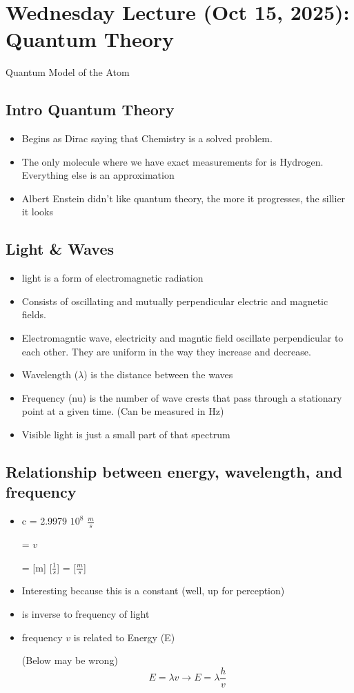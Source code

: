 \documentclass{article}
\begin{document}
\newpage

\section{Wednesday Lecture (Oct 15, 2025):\\ Quantum Theory}
Quantum Model of the Atom
\subsection{Intro Quantum Theory}
\begin{itemize}
  \item Begins as Dirac saying that Chemistry is a solved problem.
  \item The only molecule where we have exact measurements for is Hydrogen. Everything else is an approximation
  \item Albert Enstein didn't like quantum theory, the more it progresses, the sillier it looks
\end{itemize}

\subsection{Light \& Waves}
\begin{itemize}
  \item light is a form of electromagnetic radiation
  \item Consists of oscillating and mutually perpendicular electric and magnetic fields.
  \item Electromagntic wave, electricity and magntic field oscillate perpendicular to each other.
    They are uniform in the way they increase and decrease.
  \item Wavelength ($\lambda{}$) is the distance between the waves
  \item Frequency (nu) is the number of wave crests that pass through a stationary point at a given time.
    (Can be measured in Hz)
  \item Visible light is just a small part of that spectrum
\end{itemize}

\subsection{Relationship between energy, wavelength, and frequency}
\begin{itemize}
  \item c = 2.9979 \times $10^8 $ $\frac{m}{s}$

    = \lambda{}$v$

    = [m] [$\frac{1}{s}$] = [$\frac{m}{s}$]
  \item Interesting because this is a constant (well, up for perception)
  \item \lambda{} is inverse to frequency of light
  \item frequency $v$ is related to Energy (E)

    (Below may be wrong)
    $$ E = \lambda{}v \rightarrow{} E = \lambda{} \frac{h}{v} $$
\end{itemize}
\end{document}
